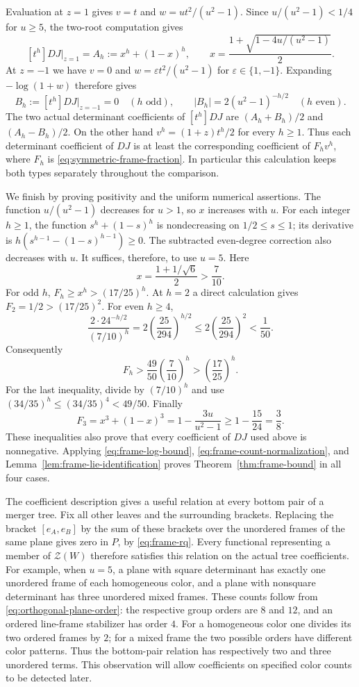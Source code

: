 Evaluation at $z=1$ gives $v=t$ and
$w=u t^2/(u^2-1)$.  Since $u/(u^2-1)<1/4$ for $u\geq5$,
the two-root computation gives
\[
 [t^h]DJ\big|_{z=1}=A_h:=x^h+(1-x)^h,
 \qquad x=\frac{1+\sqrt{1-4u/(u^2-1)}}2.
\]
At $z=-1$ we have $v=0$ and $w=\varepsilon t^2/(u^2-1)$ for
$\varepsilon\in\{1,-1\}$.  Expanding $-\log(1+w)$ therefore gives
\[
 B_h:=[t^h]DJ\big|_{z=-1}=0\quad(h\text{ odd}),
 \qquad |B_h|=2(u^2-1)^{-h/2}\quad(h\text{ even}).
\]
The two actual determinant coefficients of $[t^h]DJ$ are
$(A_h+B_h)/2$ and $(A_h-B_h)/2$.  On the other hand
$v^h=(1+z)t^h/2$ for every $h\geq1$.  Thus each determinant coefficient
of $DJ$ is at least the corresponding coefficient of $F_hv^h$, where
$F_h$ is \eqref{eq:symmetric-frame-fraction}.  In particular this
calculation keeps both types separately throughout the comparison.

We finish by proving positivity and the uniform numerical assertions.
The function $u/(u^2-1)$ decreases for $u>1$, so $x$ increases with $u$.
For each integer $h\geq1$, the function $s^h+(1-s)^h$ is nondecreasing
on $1/2\leq s\leq1$; its derivative is
$h(s^{h-1}-(1-s)^{h-1})\geq0$.  The subtracted even-degree correction
also decreases with $u$.  It suffices, therefore, to use $u=5$.
Here
\[
 x=\frac{1+1/\sqrt6}{2}>\frac7{10}.
\]
For odd $h$, $F_h\geq x^h>(17/25)^h$.  At $h=2$ a direct calculation
gives $F_2=1/2>(17/25)^2$.  For even $h\geq4$,
\[
 \frac{2\cdot24^{-h/2}}{(7/10)^h}
   =2\left(\frac{25}{294}\right)^{h/2}
   \leq2\left(\frac{25}{294}\right)^2<\frac1{50}.
\]
Consequently
\[
 F_h>\frac{49}{50}\left(\frac7{10}\right)^h
       >\left(\frac{17}{25}\right)^h.
\]
For the last inequality, divide by $(7/10)^h$ and use
$(34/35)^h\leq(34/35)^4<49/50$.
Finally
\[
 F_3=x^3+(1-x)^3
     =1-\frac{3u}{u^2-1}\geq1-\frac{15}{24}=\frac38.
\]
These inequalities also prove that every coefficient of $DJ$ used
above is nonnegative.  Applying \eqref{eq:frame-log-bound},
\eqref{eq:frame-count-normalization}, and
Lemma~\ref{lem:frame-lie-identification} proves
Theorem~\ref{thm:frame-bound} in all four cases.

\begin{remark}\label{rem:frame-cherry}
The coefficient description gives a useful relation at every bottom
pair of a merger tree.  Fix all other leaves and the surrounding
brackets.  Replacing the bracket $[e_A,e_B]$ by the sum of these
brackets over the unordered frames of the same plane gives zero in
$P$, by \eqref{eq:frame-rq}.  Every functional representing a member
of $\mathcal Z(W)$ therefore satisfies this relation on the actual
tree coefficients.  For example, when $u=5$, a plane with square
determinant has exactly one unordered frame of each homogeneous
color, and a plane with nonsquare determinant has three unordered
mixed frames.  These counts follow from
\eqref{eq:orthogonal-plane-order}: the respective group orders are
$8$ and $12$, and an ordered line-frame stabilizer has order $4$.
For a homogeneous color one divides its two ordered frames by $2$;
for a mixed frame the two possible orders have different color
patterns.  Thus the bottom-pair relation has respectively two and
three unordered terms.  This observation will allow coefficients
on specified color counts to be detected later.
\end{remark}
